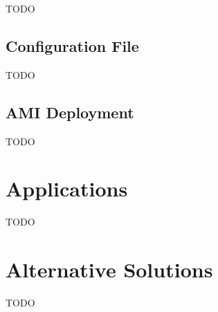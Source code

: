 TODO

\subsection{Configuration File}
\label{ssec:setting-up-a-custom-ami-configuration-file}

TODO

\subsection{AMI Deployment}
\label{ssec:ami-deployment}

TODO

\section{Applications}
\label{sec:aws-parallelcluster-applications}

TODO

\section{Alternative Solutions}
\label{sec:alternative-solutions}

TODO
